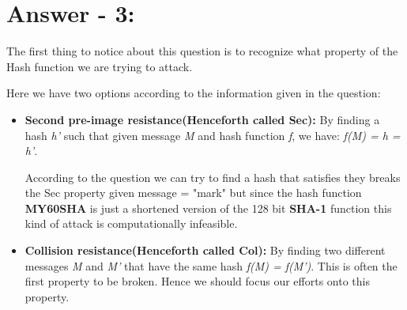 \documentclass[10pt,a4paper,oneside]{article}
\begin{document}
\section*{Answer - 3:}
The first thing to notice about this question is to recognize what property of the Hash function we are trying to attack.\par
Here we have two options according to the information given in the question:
\begin{itemize}
\item \textbf{Second pre-image resistance(Henceforth called Sec):}
By finding a hash \textit{h'} such that given message \textit{M} and hash function \textit{f}, we have: \textit{f(M) = h = h'}.\par
According to the question we can try to find a hash that satisfies they breaks the Sec property given message = "mark" but since the hash function \textbf{MY60SHA} is just a shortened version of the 128 bit \textbf{SHA-1} function this kind of attack is computationally infeasible.

\item \textbf{Collision resistance(Henceforth called Col):}
By finding two different messages \textit{M} and \textit{M'} that have the same hash \textit{f(M) = f(M')}. This is often the first property to be broken. Hence we should focus our efforts onto this property.
\end{itemize}
\end{document}
